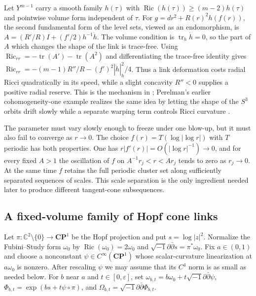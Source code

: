 \documentclass[11pt]{amsart}
\theoremstyle{definition}
\theoremstyle{remark}
\begin{document}
Let $Y^{m-1}$ carry a smooth family $h(\tau)$ with $\operatorname{Ric}(h(\tau))\geq(m-2)h(\tau)$ and pointwise volume form independent of $\tau$.  For $g=dr^2+R(r)^2h(f(r))$, the second fundamental form of the level sets, viewed as an endomorphism, is $A=(R'/R)I+(f'/2)h^{-1}\dot h$.  The volume condition is $\operatorname{tr}_h\dot h=0$, so the part of $A$ which changes the shape of the link is trace-free.  Using $\operatorname{Ric}_{rr}=-\operatorname{tr}(A')-\operatorname{tr}(A^2)$ and differentiating the trace-free identity gives $\operatorname{Ric}_{rr}=-(m-1)R''/R-(f')^2|\dot h|_h^2/4$.  Thus a link deformation costs radial Ricci quadratically in its speed, while a slight concavity $R''<0$ supplies a positive radial reserve.  This is the mechanism in \cite{ColdingNaberTangents}; Perelman's earlier cohomogeneity-one example realizes the same idea by letting the shape of the $S^3$ orbits drift slowly while a separate warping term controls Ricci curvature \cite{PerelmanNonunique}.

The parameter must vary slowly enough to freeze under one blow-up, but it must also fail to converge as $r\to0$.  The choice $f(r)=T(\log|\log r|)$ with $T$ periodic has both properties.  One has $r|f'(r)|=O(|\log r|^{-1})\to0$, and for every fixed $A>1$ the oscillation of $f$ on $A^{-1}r_j<r<Ar_j$ tends to zero as $r_j\to0$.  At the same time $f$ retains the full periodic cluster set along sufficiently separated sequences of scales.  This scale separation is the only ingredient needed later to produce different tangent-cone subsequences.

\subsection{A fixed-volume family of Hopf cone links}
\label{subsec:appendix-hopf}

Let $\pi:\mathbb C^2\setminus\{0\}\to\mathbf{CP}^1$ be the Hopf projection and put $s=\log|z|^2$.  Normalize the Fubini--Study form $\omega_0$ by $\operatorname{Ric}(\omega_0)=2\omega_0$ and $\sqrt{-1}\partial\bar\partial s=\pi^*\omega_0$.  Fix $a\in(0,1)$ and choose a nonconstant $\psi\in C^\infty(\mathbf{CP}^1)$ whose scalar-curvature linearization at $a\omega_0$ is nonzero.  After rescaling $\psi$ we may assume that its $C^4$ norm is as small as needed below.  For $b$ near $a$ and $t\in[0,\varepsilon]$, set $\omega_{b,t}=b\omega_0+t\sqrt{-1}\partial\bar\partial\psi$, $\Phi_{b,t}=\exp(bs+t\psi\circ\pi)$, and $\Omega_{b,t}=\sqrt{-1}\partial\bar\partial\Phi_{b,t}$.
\end{document}
